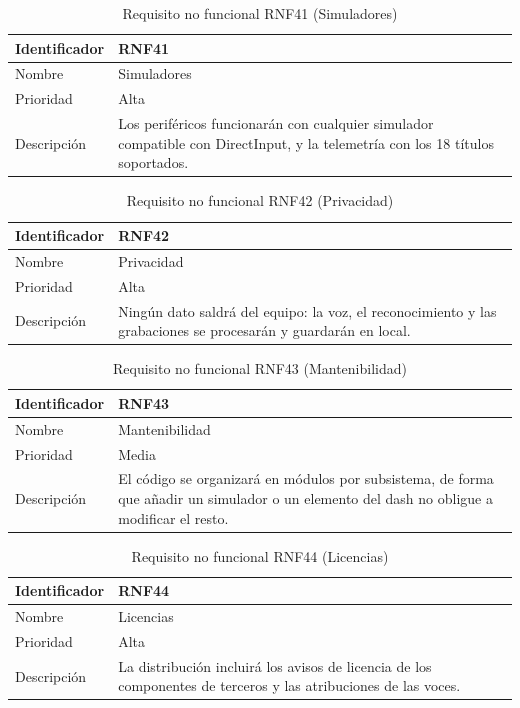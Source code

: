 \begin{table}[H]
	\centering
	\renewcommand{\arraystretch}{2}
	\begin{tabular}{|l|p{10cm}|}
		\hline
		Identificador & RNF41 \\
		\hline
		Nombre & Simuladores \\
		\hline
		Prioridad & Alta \\
		\hline
		Descripción & Los periféricos funcionarán con cualquier simulador compatible con DirectInput, y la telemetría con los 18 títulos soportados. \\
		\hline
	\end{tabular}
	\caption{Requisito no funcional RNF41 (Simuladores)}
	\label{tab:rnf41}
\end{table}

\begin{table}[H]
	\centering
	\renewcommand{\arraystretch}{2}
	\begin{tabular}{|l|p{10cm}|}
		\hline
		Identificador & RNF42 \\
		\hline
		Nombre & Privacidad \\
		\hline
		Prioridad & Alta \\
		\hline
		Descripción & Ningún dato saldrá del equipo: la voz, el reconocimiento y las grabaciones se procesarán y guardarán en local. \\
		\hline
	\end{tabular}
	\caption{Requisito no funcional RNF42 (Privacidad)}
	\label{tab:rnf42}
\end{table}

\begin{table}[H]
	\centering
	\renewcommand{\arraystretch}{2}
	\begin{tabular}{|l|p{10cm}|}
		\hline
		Identificador & RNF43 \\
		\hline
		Nombre & Mantenibilidad \\
		\hline
		Prioridad & Media \\
		\hline
		Descripción & El código se organizará en módulos por subsistema, de forma que añadir un simulador o un elemento del dash no obligue a modificar el resto. \\
		\hline
	\end{tabular}
	\caption{Requisito no funcional RNF43 (Mantenibilidad)}
	\label{tab:rnf43}
\end{table}

\begin{table}[H]
	\centering
	\renewcommand{\arraystretch}{2}
	\begin{tabular}{|l|p{10cm}|}
		\hline
		Identificador & RNF44 \\
		\hline
		Nombre & Licencias \\
		\hline
		Prioridad & Alta \\
		\hline
		Descripción & La distribución incluirá los avisos de licencia de los componentes de terceros y las atribuciones de las voces. \\
		\hline
	\end{tabular}
	\caption{Requisito no funcional RNF44 (Licencias)}
	\label{tab:rnf44}
\end{table}

